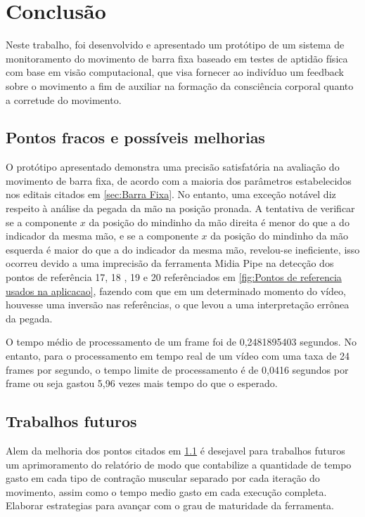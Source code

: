 \chapter{Conclusão}

Neste trabalho, foi desenvolvido e apresentado um protótipo de um sistema de monitoramento do movimento de barra fixa baseado em testes de
aptidão física com base em visão computacional, que visa fornecer ao indivíduo um feedback  sobre o movimento a fim de auxiliar na formação da consciência corporal quanto a corretude do movimento.


\section[Pontos fracos e possíveis melhorias]{Pontos fracos e possíveis melhorias}\label{sec:Pontos fracos e possiveis melhorias}

O protótipo apresentado demonstra uma precisão satisfatória na avaliação do movimento de barra fixa, de acordo com a maioria dos parâmetros estabelecidos nos editais citados em \ref{sec:Barra Fixa}. No entanto, uma exceção notável diz respeito à análise da pegada da mão na posição pronada. A tentativa de verificar se a componente $x$ da posição do mindinho da mão direita é menor do que a do indicador da mesma mão, e se a componente $x$ da posição do mindinho da mão esquerda é maior do que a do indicador da mesma mão, revelou-se ineficiente, isso ocorreu devido a uma imprecisão da ferramenta Midia Pipe na detecção dos pontos de referência 17, 18 , 19 e 20 referênciados em \ref{fig:Pontos de referencia usados na aplicacao}, fazendo com que em um determinado momento do vídeo, houvesse uma inversão nas referências, o que levou a uma interpretação errônea da pegada.

O tempo médio de processamento de um frame foi de 0,2481895403 segundos. No entanto, para o processamento em tempo real de um vídeo com uma taxa de 24 frames por segundo, o tempo limite de processamento é de 0,0416 segundos por frame ou seja gastou 5,96 vezes mais tempo do que o esperado.


\section[Trabalhos futuros]{Trabalhos futuros}
Alem da melhoria dos pontos citados em \ref{sec:Pontos fracos e possiveis melhorias} é desejavel para trabalhos futuros um aprimoramento do relatório de modo que contabilize a quantidade de tempo gasto em cada tipo de contração muscular separado por cada iteração do movimento, assim como o tempo medio gasto em cada execução completa. Elaborar estrategias para avançar com o grau de maturidade da ferramenta.
